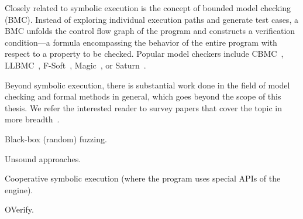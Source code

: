 Closely related to symbolic execution is the concept of bounded model checking (BMC).  Instead of exploring individual execution paths and generate test cases, a BMC unfolds the control flow graph of the program and constructs a verification condition---a formula encompassing the behavior of the entire program with respect to a property to be checked.  Popular model checkers include CBMC~\cite{cbmc}, LLBMC~\cite{llbmc2012}, F-Soft~\cite{f-soft}, Magic~\cite{magic}, or Saturn~\cite{saturn}.

Beyond symbolic execution, there is substantial work done in the field of model checking and formal methods in general, which goes beyond the scope of this thesis.  We refer the interested reader to survey papers that cover the topic in more breadth~\cite{jhala2009software, woodcock2009formal}.

Black-box (random) fuzzing.

Unsound approaches.

Cooperative symbolic execution (where the program uses special APIs of the engine).

OVerify.





